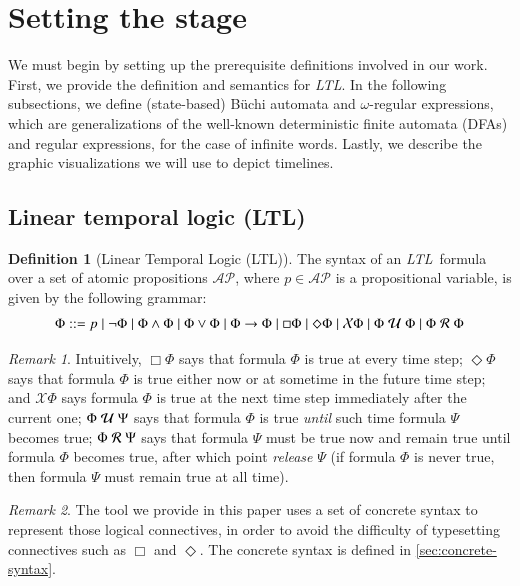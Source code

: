 \documentclass[preprint,12pt]{elsarticle}
\theoremstyle{definition}
\newtheorem{definition}{Definition}[section]
\theoremstyle{remark}
\newtheorem{remark}{Remark}[section]
\newcommand{\AP}{\mathcal{AP}}
\newcommand{\always}{\Box}
\newcommand{\eventually}{\Diamond}
\newcommand{\nextt}{\mathcal{X}}
\newcommand{\limplies}{\rightarrow}
\newcommand{\ltl}{\textit{LTL}}
\newcommand{\Buchi}{B\"{u}chi }
\newcommand{\stronguntil}{\hspace{0.1cm} \mathcal{U}  \hspace{0.1cm}}
\newcommand{\weakrelease}{\hspace{0.1cm} \mathcal{R} \hspace{0.1cm}}
\begin{document}
\section{Setting the stage}

We must begin by setting up the prerequisite definitions involved in our work.
First, we provide the definition and semantics for \ltl. In the following subsections, we define (state-based) \Buchi automata and $\omega$-regular expressions, which are generalizations of the well-known deterministic finite automata (DFAs) and regular expressions, for the case of infinite words. Lastly, we describe the graphic visualizations we will use to depict timelines.

\subsection{Linear temporal logic (LTL)} \label{sec:ltl}

\begin{definition}[Linear Temporal Logic (LTL)]
    The syntax of an \ltl\ formula over a set of atomic propositions $\AP$, where $p\in\AP$ is a propositional variable, is given by the following grammar:
    \begin{align*}
        \Phi ::= p \mid \neg \Phi \mid \Phi \land \Phi \mid \Phi \lor \Phi \mid \Phi \limplies \Phi \mid \always \Phi \mid \eventually \Phi \mid \nextt \Phi \mid \Phi \stronguntil \Phi \mid \Phi \weakrelease \Phi
    \end{align*}\label{ltl-defn}
\end{definition}

\begin{remark}
    Intuitively, $\always \Phi$ says that formula $\Phi$ is true at every time step; $\eventually \Phi$ says that formula $\Phi$ is true either now or at sometime in the future time step; and $\nextt \Phi$ says formula $\Phi$ is true at the next time step immediately after the current one; $\Phi \stronguntil \Psi$ says that formula $\Phi$ is true \textit{until} such time formula $\Psi$ becomes true; $\Phi \weakrelease \Psi$ says that formula $\Psi$ must be true now and remain true until formula $\Phi$ becomes true, after which point \textit{release} $\Psi$ (if formula $\Phi$ is never true, then formula $\Psi$ must remain true at all time).
\end{remark}

\begin{remark}
    The tool we provide in this paper uses a set of concrete syntax to represent those logical connectives, in order to avoid the difficulty of typesetting connectives such as $\always$ and $\eventually$. The concrete syntax is defined in \ref{sec:concrete-syntax}.
\end{remark}
\end{document}
